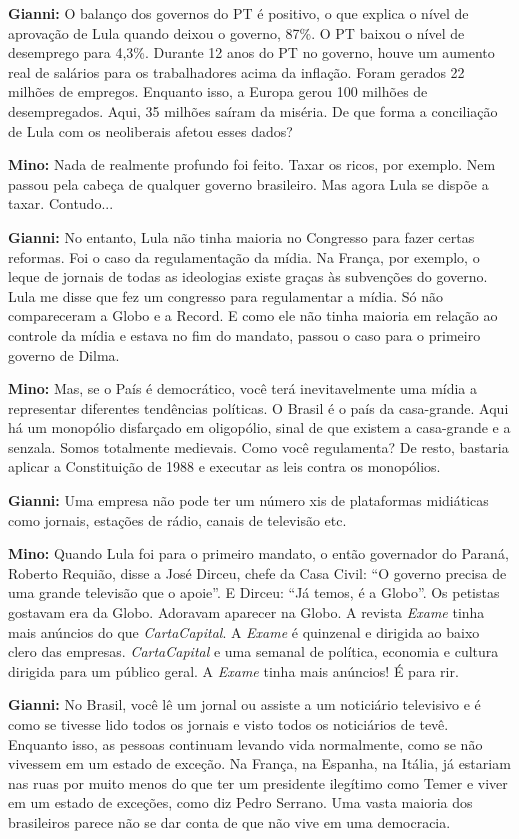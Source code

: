 \textbf{Gianni:} O balanço dos governos do PT é positivo, o que explica
o nível de aprovação de Lula quando deixou o governo, 87\%. O PT baixou
o nível de desemprego para 4,3\%. Durante 12 anos do PT no governo,
houve um aumento real de salários para os trabalhadores acima da
inflação. Foram gerados 22 milhões de empregos. Enquanto isso, a Europa
gerou 100 milhões de desempregados. Aqui, 35 milhões saíram da miséria.
De que forma a conciliação de Lula com os neoliberais afetou esses
dados?

\textbf{Mino:} Nada de realmente profundo foi feito. Taxar os ricos, por
exemplo. Nem passou pela cabeça de qualquer governo brasileiro. Mas
agora Lula se dispõe a taxar. Contudo...

\textbf{Gianni:} No entanto, Lula não tinha maioria no Congresso para
fazer certas reformas. Foi o caso da regulamentação da mídia. Na França,
por exemplo, o leque de jornais de todas as ideologias existe graças às
subvenções do governo. Lula me disse que fez um congresso para
regulamentar a mídia. Só não compareceram a Globo e a Record. E como ele
não tinha maioria em relação ao controle da mídia e estava no fim do
mandato, passou o caso para o primeiro governo de Dilma.

\textbf{Mino:} Mas, se o País é democrático, você terá inevitavelmente
uma mídia a representar diferentes tendências políticas. O Brasil é o
país da casa-grande. Aqui há um monopólio disfarçado em oligopólio,
sinal de que existem a casa-grande e a senzala. Somos totalmente
medievais. Como você regulamenta? De resto, bastaria aplicar a
Constituição de 1988 e executar as leis contra os monopólios.

\textbf{Gianni:} Uma empresa não pode ter um número xis de plataformas
midiáticas como jornais, estações de rádio, canais de televisão etc.

\textbf{Mino:} Quando Lula foi para o primeiro mandato, o então
governador do Paraná, Roberto Requião, disse a José Dirceu, chefe da
Casa Civil: ``O governo precisa de uma grande televisão que o apoie''. E
Dirceu: ``Já temos, é a Globo''. Os petistas gostavam era da Globo.
Adoravam aparecer na Globo. A revista \emph{Exame} tinha mais anúncios
do que \emph{CartaCapital}. A \emph{Exame} é quinzenal e dirigida ao
baixo clero das empresas. \emph{CartaCapital} e uma semanal de política,
economia e cultura dirigida para um público geral. A \emph{Exame} tinha
mais anúncios! É para rir.

\textbf{Gianni:} No Brasil, você lê um jornal ou assiste a um noticiário
televisivo e é como se tivesse lido todos os jornais e visto todos os
noticiários de tevê. Enquanto isso, as pessoas continuam levando vida
normalmente, como se não vivessem em um estado de exceção. Na França, na
Espanha, na Itália, já estariam nas ruas por muito menos do que ter um
presidente ilegítimo como Temer e viver em um estado de exceções, como
diz Pedro Serrano. Uma vasta maioria dos brasileiros parece não se dar
conta de que não vive em uma democracia.

